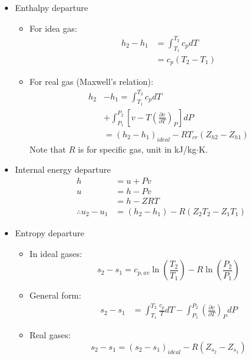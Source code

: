 \begin{itemize}
    \item Enthalpy departure
    \begin{itemize}
        \item For idea gas:
        \begin{align*}
            h_2 - h_1 &= \int_{T_1}^{T_2} c_p dT \\
            &= c_p (T_2 - T_1)
        \end{align*}
        \item For real gas (Maxwell's relation):
        \begin{align*}
            h_2 &- h_1 = \int_{T_1}^{T_2} c_p dT \\
            &+ \int_{P_1}^{P_2} \left[v - T \left(\frac{\partial v}{\partial T}\right)_P \right] dP \\
            &= (h_2 - h_1)_{ideal} - R T_{cr} (Z_{h2} - Z_{h1})
        \end{align*}
        Note that $R$ is for specific gas, unit in kJ/kg$\cdot$K.
    \end{itemize}
    \item Internal energy departure
    \begin{align*}
        h &= u + Pv \\
        u &= h - Pv \\
        &= h - ZRT \\
        \therefore u_2 - u_1 &= (h_2 - h_1) - R(Z_2 T_2 - Z_1 T_1)
    \end{align*}
    \item Entropy departure
    \begin{itemize}
        \item In ideal gases:
        \begin{equation*}
            s_2 - s_1 = c_{p,av} \ln \left(\frac{T_2}{T_1}\right) - R \ln \left(\frac{P_2}{P_1}\right)
        \end{equation*}
        \item General form:
        \begin{align*}
            s_2 - s_1 &= \int_{T_1}^{T_2} \frac{c_p}{T} dT - \int_{P_1}^{P_2} \left(\frac{\partial v}{\partial T}\right)_P dP
        \end{align*}
        \item Real gases:
        \begin{equation*}
            s_2 - s_1 = (s_2 -s_1)_{ideal} - R(Z_{s_2} - Z_{s_1})
        \end{equation*}
    \end{itemize}
\end{itemize}

